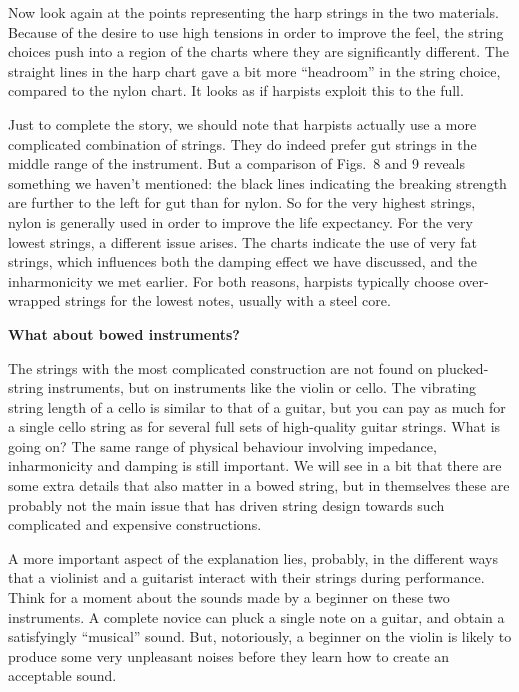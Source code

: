   Now look again at the points representing the harp strings in the two 
  materials. Because of the desire to use high tensions in order to improve the 
  feel, the string choices push into a region of the charts where they are 
  significantly different. The straight lines in the harp chart gave a bit more 
  ``headroom'' in the string choice, compared to the nylon chart. It looks as 
  if harpists exploit this to the full. 

  Just to complete the story, we should note that harpists actually use a more 
  complicated combination of strings. They do indeed prefer gut strings in the 
  middle range of the instrument. But a comparison of Figs.\ 8 and 9 reveals 
  something we haven't mentioned: the black lines indicating the breaking 
  strength are further to the left for gut than for nylon. So for the very 
  highest strings, nylon is generally used in order to improve the life 
  expectancy. For the very lowest strings, a different issue arises. The charts 
  indicate the use of very fat strings, which influences both the damping 
  effect we have discussed, and the inharmonicity we met earlier. For both 
  reasons, harpists typically choose over-wrapped strings for the lowest notes, 
  usually with a steel core. 

  \textbf{What about bowed instruments?} 

  The strings with the most complicated construction are not found on 
  plucked-string instruments, but on instruments like the violin or cello. The 
  vibrating string length of a cello is similar to that of a guitar, but you 
  can pay as much for a single cello string as for several full sets of 
  high-quality guitar strings. What is going on? The same range of physical 
  behaviour involving impedance, inharmonicity and damping is still important. 
  We will see in a bit that there are some extra details that also matter in a 
  bowed string, but in themselves these are probably not the main issue that 
  has driven string design towards such complicated and expensive 
  constructions. 

  A more important aspect of the explanation lies, probably, in the different 
  ways that a violinist and a guitarist interact with their strings during 
  performance. Think for a moment about the sounds made by a beginner on these 
  two instruments. A complete novice can pluck a single note on a guitar, and 
  obtain a satisfyingly “musical” sound. But, notoriously, a beginner on the 
  violin is likely to produce some very unpleasant noises before they learn how 
  to create an acceptable sound. 

